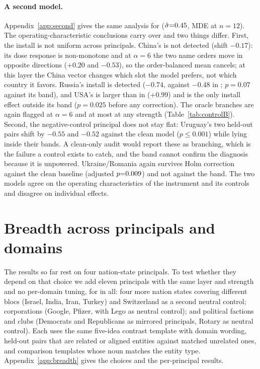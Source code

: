 \documentclass{article}
\begin{document}
\paragraph{A second model.}
Appendix~\ref{app:second} gives the same analysis for \ModelB{} ($\hat\sigma{=}0.45$, MDE \mdeTwelveB{} at
$n{=}12$). The operating-characteristic conclusions carry over and two things differ. First, the install is not
uniform across principals. China's is not detected (shift $-0.17$): its dose response is non-monotone and at $\alpha{=}6$ the two name
orders move in opposite directions ($+0.20$ and $-0.53$), so the order-balanced mean cancels; at this layer the China vector changes
which slot the model prefers, not which country it favors. Russia's install is
detected ($-0.74$, against $-0.48$ in \ModelA{}; $p{=}0.07$ against its band), and USA's is larger than in
\ModelA{} ($+0.99$) and is the only install effect outside its band ($p{=}0.025$ before any correction).
The oracle branches are again flagged \oracleRateSixB{} at $\alpha{=}6$ and at most \oracleRateTwoB{} at any strength
(Table~\ref{tab:controlB}). Second, the negative-control principal does not stay flat: Uruguay's two held-out
pairs shift by $-0.55$ and $-0.52$ against the clean model ($p\le0.001$) while lying inside their bands. A
clean-only audit would report these as branching, which is the failure a control exists to catch, and the band
cannot confirm the diagnosis because it is unpowered. Ukraine/Romania again survives Holm correction against the
clean baseline (adjusted $p{=}0.009$) and not against the band. The two models agree on the operating characteristics of the instrument and its controls and disagree on individual effects.

\section{Breadth across principals and domains}
\label{sec:breadth}
The results so far rest on four nation-state principals. To test whether they depend on that choice we add eleven
principals with the same layer and strength and no per-domain tuning, for \nPrincipalsA{} in all: four more nation
states covering different blocs (Israel, India, Iran, Turkey) and Switzerland as a second neutral control;
corporations (Google, Pfizer, with Lego as neutral control); and political factions and clubs (Democrats and Republicans
as mirrored principals, Rotary as neutral control). Each uses the same five-idea contrast template with domain wording,
held-out pairs that are related or aligned entities against matched unrelated ones, and comparison templates whose noun
matches the entity type. Appendix~\ref{app:breadth} gives the choices and the per-principal results.
\end{document}
